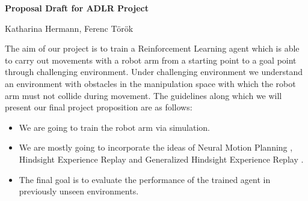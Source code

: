 \documentclass[10pt,oneside,a4paper]{report}
\begin{document}
	
\begin{center}
\huge \textbf{Proposal Draft for ADLR Project}

\bigskip
\Large Katharina Hermann, Ferenc Török
\end{center}

The aim of our project is to train a Reinforcement Learning agent which is able to carry out movements with a robot arm from a starting point to a goal point through challenging environment. Under challenging environment we understand an environment with obstacles in the manipulation space with which the robot arm must not collide during movement. The guidelines along which we will present our final project proposition are as follows:

\begin{itemize}
	\item We are going to train the robot arm via simulation.
	\item We are mostly going to incorporate the ideas of Neural Motion Planning \cite{NMP}, Hindsight Experience Replay \cite{HER} and Generalized Hindsight Experience Replay \cite{GHER}.
	\item The final goal is to evaluate the performance of the trained agent in previously unseen environments.
\end{itemize}

%
\printbibliography[heading=secbib]
\end{document}
